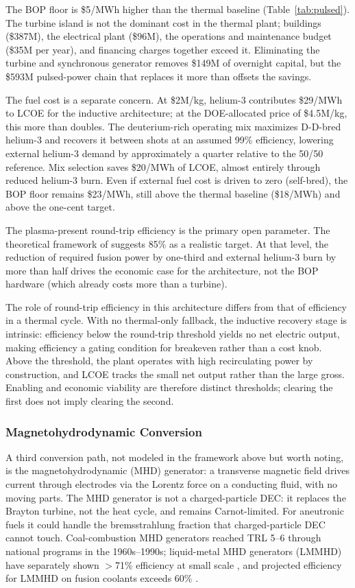 \documentclass{article}
\begin{document}
The BOP floor is \$5/MWh higher than the thermal baseline
(Table~\ref{tab:pulsed}). The turbine island is not the dominant
cost in the thermal plant; buildings (\$387M), the electrical
plant (\$96M), the operations and maintenance budget
(\$35M per year), and financing charges together exceed it.
Eliminating the turbine and synchronous generator removes
\$149M of overnight capital, but the \$593M
pulsed-power chain that replaces it more than offsets the savings.

The fuel cost is a separate concern. At \$2M/kg, helium-3
contributes \$29/MWh to LCOE for the inductive architecture; at
the DOE-allocated price of \$4.5M/kg, this more than doubles.
The deuterium-rich operating mix maximizes D-D-bred helium-3 and
recovers it between shots at an assumed 99\% efficiency, lowering
external helium-3 demand by approximately a quarter relative to the
50/50 reference. Mix selection saves \$20/MWh of LCOE,
almost entirely through reduced helium-3 burn. Even if external
fuel cost is driven to zero (self-bred), the BOP floor remains
\$23/MWh, still above the thermal baseline (\$18/MWh) and above
the one-cent target.

The plasma-present round-trip efficiency is the primary open
parameter. The theoretical framework of \citet{Kirtley2024}
suggests 85\% as a realistic target. At that level, the reduction
of required fusion power by one-third and external
helium-3 burn by more than half drives the economic case for the
architecture, not the BOP hardware (which already costs more than
a turbine).

The role of round-trip efficiency in this architecture differs from
that of efficiency in a thermal cycle. With no thermal-only
fallback, the inductive recovery stage is intrinsic: efficiency
below the round-trip threshold yields no net electric output,
making efficiency a gating condition for breakeven rather than a
cost knob. Above the threshold, the plant operates with high
recirculating power by construction, and LCOE tracks the small net
output rather than the large gross. Enabling and economic
viability are therefore distinct thresholds; clearing the first
does not imply clearing the second.

\subsubsection{Magnetohydrodynamic Conversion}
\label{sec:mhd}

A third conversion path, not modeled in the framework above but
worth noting, is the magnetohydrodynamic (MHD) generator: a
transverse magnetic field drives current through electrodes via the
Lorentz force on a conducting fluid, with no moving parts. The MHD
generator is not a charged-particle DEC: it replaces the Brayton
turbine, not the heat cycle, and remains Carnot-limited. For
aneutronic fuels it could handle the bremsstrahlung fraction that
charged-particle DEC cannot touch. Coal-combustion MHD generators
reached TRL 5--6 through national programs in the 1960s--1990s;
liquid-metal MHD generators (LMMHD) have separately shown $>$71\%
efficiency at small scale \citep{Fabris1981}, and projected
efficiency for LMMHD on fusion coolants exceeds 60\%
\citep{Smolentsev2022}.
\end{document}
